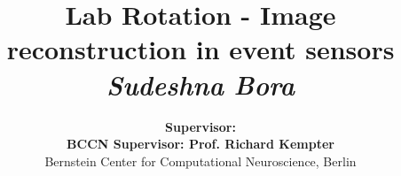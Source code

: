 \documentclass[12pt]{article}
\begin{document}
\begin{titlepage}

\title{     \textbf{Lab Rotation - Image reconstruction in event sensors}\\[2.5ex]
\textit{Sudeshna Bora} }

\author{    
             \textbf{Supervisor:}  \\[2.5ex]
             \textbf{BCCN Supervisor: Prof. Richard Kempter}  \\[2.5ex]
            \normalsize{Bernstein Center for Computational Neuroscience, Berlin}        \\
       }
\date{}

\end{titlepage}

\maketitle
\thispagestyle{empty} 

\maketitle

{
  \hypersetup{linkcolor=black}
  \tableofcontents
}

\newpage\cleardoublepage

\newpage\cleardoublepage

\newpage\cleardoublepage


\newpage\cleardoublepage
\end{document}
